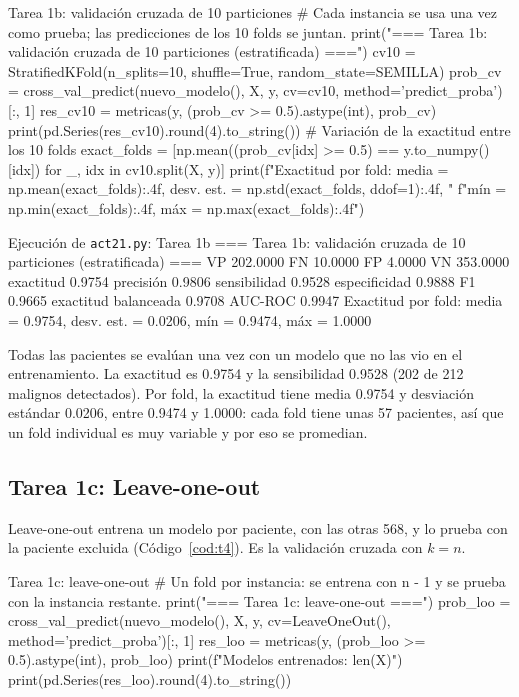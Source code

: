 \documentclass[11pt,letterpaper]{article}
\begin{document}
\begin{codigo}[label=cod:t3]{Tarea 1b: validación cruzada de 10 particiones}
# Cada instancia se usa una vez como prueba; las predicciones de los 10 folds se juntan.
print("\n=== Tarea 1b: validación cruzada de 10 particiones (estratificada) ===")
cv10 = StratifiedKFold(n_splits=10, shuffle=True, random_state=SEMILLA)
prob_cv = cross_val_predict(nuevo_modelo(), X, y, cv=cv10, method='predict_proba')[:, 1]
res_cv10 = metricas(y, (prob_cv >= 0.5).astype(int), prob_cv)
print(pd.Series(res_cv10).round(4).to_string())
# Variación de la exactitud entre los 10 folds
exact_folds = [np.mean((prob_cv[idx] >= 0.5) == y.to_numpy()[idx]) for _, idx in cv10.split(X, y)]
print(f"Exactitud por fold: media = {np.mean(exact_folds):.4f}, desv. est. = {np.std(exact_folds, ddof=1):.4f}, "
      f"mín = {np.min(exact_folds):.4f}, máx = {np.max(exact_folds):.4f}")
\end{codigo}

\begin{consola}[label=out:t3]{Ejecución de \texttt{act21.py}: Tarea 1b}
=== Tarea 1b: validación cruzada de 10 particiones (estratificada) ===
VP                      202.0000
FN                       10.0000
FP                        4.0000
VN                      353.0000
exactitud                 0.9754
precisión                 0.9806
sensibilidad              0.9528
especificidad             0.9888
F1                        0.9665
exactitud balanceada      0.9708
AUC-ROC                   0.9947
Exactitud por fold: media = 0.9754, desv. est. = 0.0206, mín = 0.9474, máx = 1.0000
\end{consola}

Todas las pacientes se evalúan una vez con un modelo que no las vio en el entrenamiento. La exactitud es 0.9754 y la sensibilidad 0.9528 (202 de 212 malignos detectados). Por fold, la exactitud tiene media 0.9754 y desviación estándar 0.0206, entre 0.9474 y 1.0000: cada fold tiene unas 57 pacientes, así que un fold individual es muy variable y por eso se promedian.

\subsection{Tarea 1c: Leave-one-out}

Leave-one-out entrena un modelo por paciente, con las otras 568, y lo prueba con la paciente excluida (Código~\ref{cod:t4}). Es la validación cruzada con $k = n$.

\begin{codigo}[label=cod:t4]{Tarea 1c: leave-one-out}
# Un fold por instancia: se entrena con n - 1 y se prueba con la instancia restante.
print("\n=== Tarea 1c: leave-one-out ===")
prob_loo = cross_val_predict(nuevo_modelo(), X, y, cv=LeaveOneOut(), method='predict_proba')[:, 1]
res_loo = metricas(y, (prob_loo >= 0.5).astype(int), prob_loo)
print(f"Modelos entrenados: {len(X)}")
print(pd.Series(res_loo).round(4).to_string())
\end{codigo}
\end{document}
